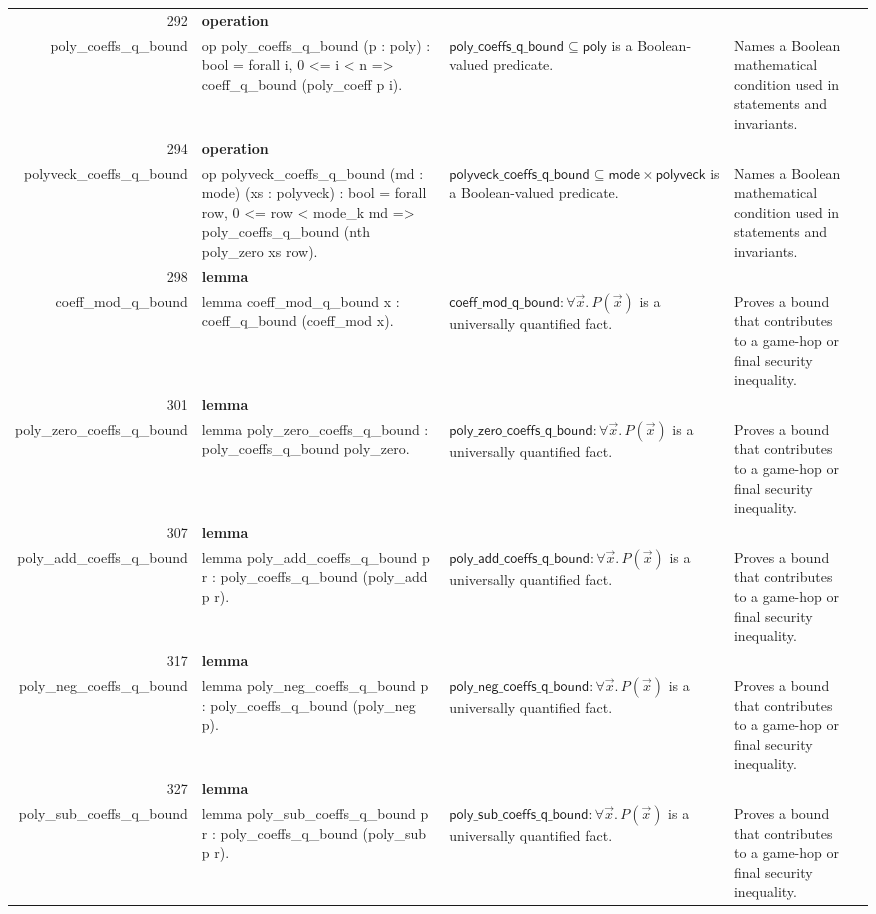 \documentclass[10pt]{article}
\newcommand{\ec}[1]{\begingroup\ttfamily\scriptsize #1\endgroup}
\begin{document}
\begin{longtable}{r L{0.17\textwidth} L{0.26\textwidth} L{0.27\textwidth} L{0.20\textwidth}}
292 & \textbf{operation}\\\ec{poly\_coeffs\_q\_bound} & \ec{op poly\_coeffs\_q\_bound (p : poly) : bool = forall i, 0 <= i < n => coeff\_q\_bound (poly\_coeff p i).} & \(\mathsf{poly\_coeffs\_q\_bound} \subseteq \mathsf{poly}\) is a Boolean-valued predicate. & Names a Boolean mathematical condition used in statements and invariants. \\
294 & \textbf{operation}\\\ec{polyveck\_coeffs\_q\_bound} & \ec{op polyveck\_coeffs\_q\_bound (md : mode) (xs : polyveck) : bool = forall row, 0 <= row < mode\_k md => poly\_coeffs\_q\_bound (nth poly\_zero xs row).} & \(\mathsf{polyveck\_coeffs\_q\_bound} \subseteq \mathsf{mode} \times \mathsf{polyveck}\) is a Boolean-valued predicate. & Names a Boolean mathematical condition used in statements and invariants. \\
298 & \textbf{lemma}\\\ec{coeff\_mod\_q\_bound} & \ec{lemma coeff\_mod\_q\_bound x : coeff\_q\_bound (coeff\_mod x).} & \(\mathsf{coeff\_mod\_q\_bound} : \forall \vec{x}.\, P(\vec{x})\) is a universally quantified fact. & Proves a bound that contributes to a game-hop or final security inequality. \\
301 & \textbf{lemma}\\\ec{poly\_zero\_coeffs\_q\_bound} & \ec{lemma poly\_zero\_coeffs\_q\_bound : poly\_coeffs\_q\_bound poly\_zero.} & \(\mathsf{poly\_zero\_coeffs\_q\_bound} : \forall \vec{x}.\, P(\vec{x})\) is a universally quantified fact. & Proves a bound that contributes to a game-hop or final security inequality. \\
307 & \textbf{lemma}\\\ec{poly\_add\_coeffs\_q\_bound} & \ec{lemma poly\_add\_coeffs\_q\_bound p r : poly\_coeffs\_q\_bound (poly\_add p r).} & \(\mathsf{poly\_add\_coeffs\_q\_bound} : \forall \vec{x}.\, P(\vec{x})\) is a universally quantified fact. & Proves a bound that contributes to a game-hop or final security inequality. \\
317 & \textbf{lemma}\\\ec{poly\_neg\_coeffs\_q\_bound} & \ec{lemma poly\_neg\_coeffs\_q\_bound p : poly\_coeffs\_q\_bound (poly\_neg p).} & \(\mathsf{poly\_neg\_coeffs\_q\_bound} : \forall \vec{x}.\, P(\vec{x})\) is a universally quantified fact. & Proves a bound that contributes to a game-hop or final security inequality. \\
327 & \textbf{lemma}\\\ec{poly\_sub\_coeffs\_q\_bound} & \ec{lemma poly\_sub\_coeffs\_q\_bound p r : poly\_coeffs\_q\_bound (poly\_sub p r).} & \(\mathsf{poly\_sub\_coeffs\_q\_bound} : \forall \vec{x}.\, P(\vec{x})\) is a universally quantified fact. & Proves a bound that contributes to a game-hop or final security inequality. \\

\end{longtable}
\end{document}
